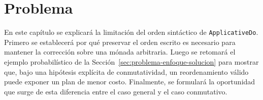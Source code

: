 
\chapter{Problema}

En este capítulo se explicará la limitación del orden sintáctico de \texttt{ApplicativeDo}. Primero se establecerá por qué preservar el orden escrito es necesario para mantener la corrección sobre una mónada arbitraria. Luego se retomará el ejemplo probabilístico de la Sección~\ref{sec:problema-enfoque-solucion} para mostrar que, bajo una hipótesis explícita de conmutatividad, un reordenamiento válido puede exponer un plan de menor costo. Finalmente, se formulará la oportunidad que surge de esta diferencia entre el caso general y el caso conmutativo.




